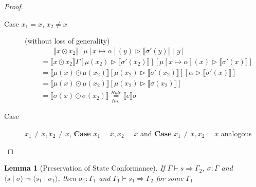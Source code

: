 \documentclass[twoside, english]{sdqthesis}
\newcommand{\tuple}[2]{\langle #1 \mid #2 \rangle}
\newcommand{\bbracket}[1]{\llbracket #1 \rrbracket}
\newcommand{\tr}[0]{\triangleright}
\newtheorem{lemma}[theorem]{Lemma}
\theoremstyle{definition}
\begin{document}
\begin{proof}
\begin{description}
\begin{description}
\begin{description}
              \begin{description}
                \item[Case $x_1=x$, $x_2 \neq x$] (without loss of generality)
                \begin{align*}
                  &\phantom{=}\ \ \bbracket{x \odot x_2}[\mu[x\mapsto \alpha](y) \tr \bbracket{\sigma'(y)} \mid y]
                  \\ &=\bbracket{x \odot x_2}\Gamma[\mu(x_2)\tr \bbracket{\sigma'(x_2)}][\mu[x \mapsto \alpha](x) \tr \bbracket{\sigma'(x)}]
                  \\ &=\bbracket{\mu(x) \odot \mu(x_2)}[\mu(x_2)\tr \bbracket{\sigma'(x_2)}][\alpha \tr \bbracket{\sigma'(x)}]
                  \\ &=\bbracket{\mu(x) \odot \mu(x_2)}[\mu(x_2)\tr \bbracket{\sigma(x_2)}]
                  \\ &=\bbracket{\sigma(x) \odot \sigma(x_2)} \underset{Inv.}{\overset{Rule}{=}} \bbracket{e}\sigma
                \end{align*}
                \item[Case] $x_1\neq x, x_2 \neq x$, \textbf{Case} $x_1 = x, x_2 = x$ and \textbf{Case} $x_1 \neq x, x_2 = x$ analogous
              \end{description}
          \end{description}
      \end{description}
  \end{description}
\end{proof}


\begin{lemma}[Preservation of State Conformance]
  If $\Gamma \vdash s \Rightarrow \Gamma_2$, $\sigma : \Gamma$ and $\tuple{s}{\sigma} \leadsto \tuple{s_1}{\sigma_1}$, then  $\sigma_1 : \Gamma_1$ and $\Gamma_1 \vdash s_1 \Rightarrow \Gamma_2$ for some $\Gamma_1$
\end{lemma}
\end{document}
